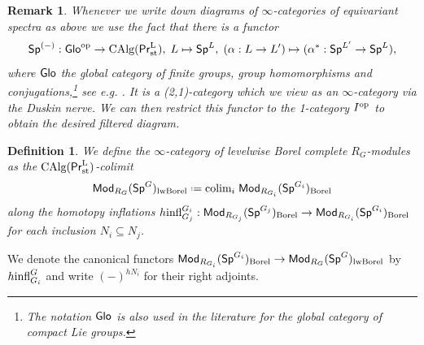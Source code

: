\documentclass[reqno]{amsart}
\numberwithin{equation}{section}\theoremstyle{thms}
\theoremstyle{defn}
\newtheorem{defi}[equation]{Definition}
\newtheorem{rem}[equation]{Remark}
\newcommand{\tn}[1]{\textnormal{#1}}
\newcommand{\tsf}[1]{\textsf{\textup{#1}}}
\newcommand*{\defeq}{\mathrel{\vcenter{\baselineskip0.4ex \lineskiplimit0pt
\hbox{\scriptsize.}\hbox{\scriptsize.}}}%
=}
\newcommand{\op}{\tn{op}}
\newcommand{\calg}{\tn{CAlg}}
\newcommand{\Mod}{\tsf{Mod}}
\newcommand{\spec}{\tsf{Sp}}
\newcommand{\specg}{\tsf{Sp}^G}
\newcommand{\prlst}{\tsf{Pr}^{\tn{L}}_{\tn{st}}}
\newcommand{\glo}{\tsf{Glo}}
\begin{document}
\begin{rem}
Whenever we write down diagrams of $\infty$-categories of equivariant spectra as above we use the fact that there is a functor
$$\spec^{(-)}: \glo^\op \to \calg(\prlst), \; L \mapsto \spec^L, \; (\alpha: L \to L') \mapsto (\alpha^*: \spec^{L'} \to \spec^L),$$
where $\glo$ the global category of finite groups, group homomorphisms and conjugations,\footnote{The notation $\glo$ is also used in the literature for the global category of compact Lie groups.} see e.g. \cite[§10]{lnp25}. It is a (2,1)-category which we view as an $\infty$-category via the Duskin nerve. We can then restrict this functor to the 1-category $I^\op$ to obtain the desired filtered diagram.
\end{rem}

\begin{defi}\label{defi:levelwiseborelcomplete}
We define the $\infty$-category of \emph{levelwise Borel complete $R_G$-modules} as the $\calg(\prlst)$-colimit 
$$\Mod_{R_G}(\specg)_{\tn{lwBorel}} \defeq \tn{colim}_i \; \Mod_{R_{G_i}}(\spec^{G_i})_{\tn{Borel}}$$
along the homotopy inflations $h\tn{infl}^{G_i}_{G_j}:\Mod_{R_{G_j}}(\spec^{G_j})_{\tn{Borel}} \to \Mod_{R_{G_i}}(\spec^{G_i})_{\tn{Borel}}$ for each inclusion $N_i \subseteq N_j$.
\end{defi}

We denote the canonical functors $\Mod_{R_{G_i}}(\spec^{G_i})_{\tn{Borel}} \to \Mod_{R_G}(\specg)_{\tn{lwBorel}}$ by $h\tn{infl}^G_{G_i}$ and write $(-)^{hN_i}$ for their right adjoints.
\end{document}
